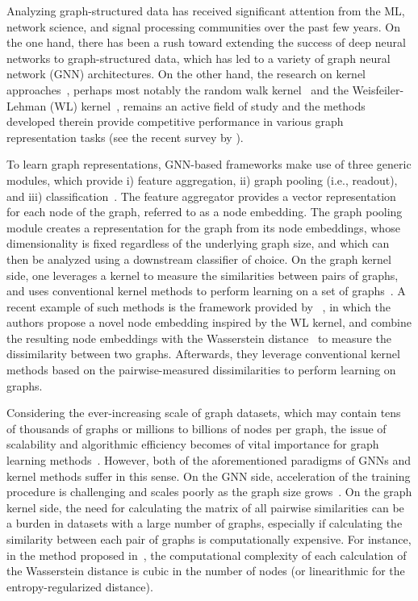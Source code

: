 \documentclass[table]{article} \usepackage{iclr2021_conference,times}
\begin{document}
Analyzing graph-structured data has received significant attention from the ML, network science, and signal processing communities over the past few years. On the one hand, there has been a rush toward extending the success of deep neural networks to graph-structured data, which has led to a variety of graph neural network (GNN) architectures. On the other hand, the research on kernel approaches~\citep{gartner2003graph}, perhaps most notably the random walk kernel~\citep{kashima2003marginalized} and the Weisfeiler-Lehman (WL) kernel~\citep{shervashidze2011weisfeiler,rieck2019persistent,morris2019weisfeiler,morris2020weisfeiler}, remains an active field of study and the methods developed therein provide competitive performance in various graph representation tasks (see the recent survey by \cite{kriege2020survey}).





To learn graph representations, GNN-based frameworks make use of three generic modules, which provide i) feature aggregation, ii) graph pooling (i.e., readout), and iii) classification~\citep{Hu*2020Strategies}. The feature aggregator provides a vector representation for each node of the graph, referred to as a node embedding. The graph pooling module creates a representation for the graph from its node embeddings, whose dimensionality is fixed regardless of the underlying graph size, and which can then be analyzed using a downstream classifier of choice. On the graph kernel side, one leverages a kernel to measure the similarities between pairs of graphs, and uses conventional kernel methods to perform learning on a set of graphs~\citep{hofmann2008kernel}. A recent example of such methods is the framework provided by ~\cite{togninalli2019wasserstein}, in which the authors propose a novel node embedding inspired by the WL kernel, and combine the resulting node embeddings with the Wasserstein distance~\citep{villani2008optimal, kolouri2017optimal} to measure the dissimilarity between two graphs. Afterwards, they leverage conventional kernel methods based on the pairwise-measured dissimilarities to perform learning on graphs.

Considering the ever-increasing scale of graph datasets, which may contain tens of thousands of graphs or millions to billions of nodes per graph, the issue of scalability and algorithmic efficiency becomes of vital importance for graph learning methods~\citep{hernandez2020measuring,hu2020open}. However, both of the aforementioned paradigms of GNNs and kernel methods suffer in this sense. On the GNN side, acceleration of the training procedure is challenging and scales poorly as the graph size grows~\citep{mlg2019_50}. On the graph kernel side, the need for calculating the matrix of all pairwise similarities can be a burden in datasets with a large number of graphs, especially if calculating the similarity between each pair of graphs is computationally expensive. For instance, in the method proposed in~\citep{togninalli2019wasserstein}, the computational complexity of each calculation of the Wasserstein distance is cubic in the number of nodes (or linearithmic for the entropy-regularized distance).
\end{document}
